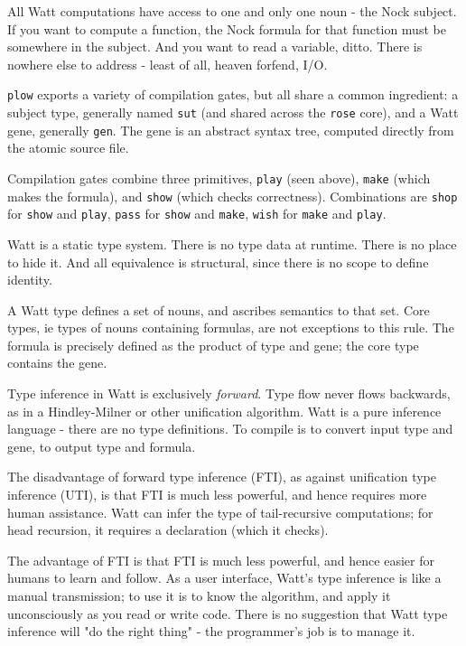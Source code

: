 \documentclass[10pt, nocopyrightspace]{sigplanconf}
\begin{document}
All Watt computations have access to one and only one noun - the
Nock subject.  If you want to compute a function, the Nock
formula for that function must be somewhere in the subject.  And
you want to read a variable, ditto.  There is nowhere else to
address - least of all, heaven forfend, I/O.

\verb|plow| exports a variety of compilation gates, but all share
a common ingredient: a subject type, generally named \verb|sut|
(and shared across the \verb|rose| core), and a Watt gene,
generally \verb|gen|.  The gene is an abstract syntax tree,
computed directly from the atomic source file.

Compilation gates combine three primitives, \verb|play| (seen
above), \verb|make| (which makes the formula), and \verb|show|
(which checks correctness).  Combinations are \verb|shop| for
\verb|show| and \verb|play|, \verb|pass| for \verb|show| and
\verb|make|, \verb|wish| for \verb|make| and \verb|play|.

Watt is a static type system.  There is no type data at runtime.
There is no place to hide it.  And all equivalence is structural,
since there is no scope to define identity.

A Watt type defines a set of nouns, and ascribes semantics to
that set.  Core types, ie types of nouns containing formulas, are
not exceptions to this rule.  The formula is precisely defined as
the product of type and gene; the core type contains the gene.

Type inference in Watt is exclusively \emph{forward}.  Type flow
never flows backwards, as in a Hindley-Milner
\citep{hindleymilner} or other
unification algorithm.  Watt is a pure inference language - there
are no type definitions.  To compile is to convert input type and
gene, to output type and formula.

The disadvantage of forward type inference (FTI), as against
unification type inference (UTI), is that FTI is much less
powerful, and hence requires more human assistance.  Watt can
infer the type of tail-recursive computations; for head
recursion, it requires a declaration (which it checks).

The advantage of FTI is that FTI is much less powerful, and
hence easier for humans to learn and follow.  As a user
interface, Watt's type inference is like a manual transmission;
to use it is to know the algorithm, and apply it unconsciously as
you read or write code.  There is no suggestion that Watt type
inference will "do the right thing" - the programmer's job is to
manage it.
\end{document}
